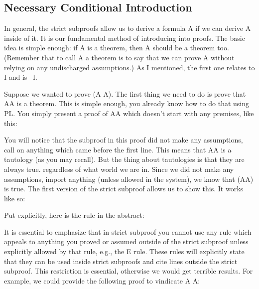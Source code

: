 \subsection{Necessary Conditional Introduction}

In general, the strict subproofs allow us to derive a formula \ebox A if we can derive A inside of it. It is our fundamental method of introducing \ebox  into proofs. The basic idea is simple enough: if A is a theorem, then \ebox A should be a theorem too. (Remember that to call A a theorem is to say that we can prove A without relying on any undischarged assumptions.) As I mentioned, the first one relates to \eif I and is  \ebox \eif I.

Suppose we wanted to prove \ebox (A \eif  A). The first thing we need to do is prove that A\eif A is a theorem. This is simple enough, you already know how to do that using PL. You simply present a proof of A\eif A which doesn’t start with any premises, like this:
\begin{fitchproof}
\open
{}
\close
{}	
\end{fitchproof}
You will notice that the subproof in this proof did not make any assumptions, call on anything which came before the first line. This means that A\eif A is a tautology (as you may recall). But the thing about tautologies is that they are always true. regardless of what world we are in. Since we did not make any assumptions, import anything (unless allowed in the system), we know that \ebox (A\eif A) is true. The first version of the strict subproof allows us to show this. It works like so:
\begin{fitchproof}
\open
{}
\close
{}	
\end{fitchproof}

Put explicitly, here is the rule in the abstract:

It is essential to emphasize that in strict subproof you cannot use any rule which appeals to anything you proved or assumed outside of the strict subproof unless explicitly allowed by that rule, e.g., the \ebox E rule. These rules will explicitly state that they can be used inside strict subproofs and cite lines outside the strict subproof. This restriction is essential, otherwise we would get terrible results. For example, we could provide the following proof to vindicate A \therefore  \ebox A:
\begin{fitchproof}
\open
{}
\close
{} 
 
 
 
\end{fitchproof}

